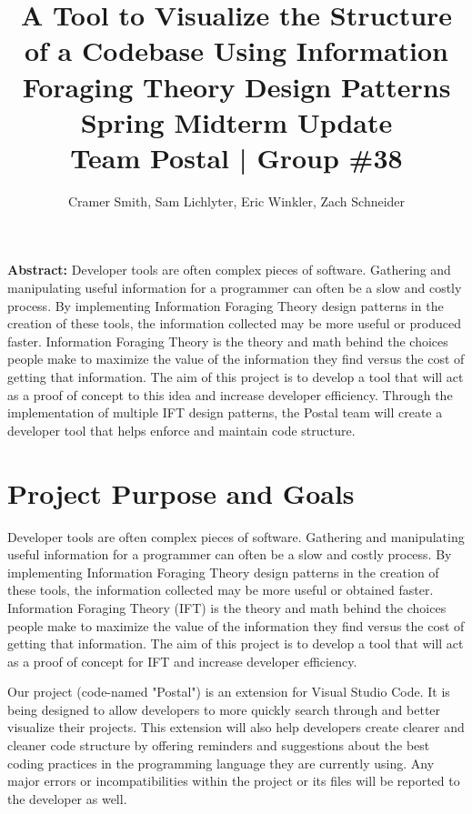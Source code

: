 \documentclass[letterpaper,10pt,titlepage,draftclsnofoot,onecolumn,onesided] {IEEEtran}
\def\doctitle{A Tool to Visualize the Structure of a Codebase Using Information Foraging Theory Design Patterns}
\def\doctype{Progress Report}
\def\doctype{Spring Midterm Update}
\def\team{Team Postal | Group \#38}
\begin{document}
\title{\Huge{\bfseries{\textsf{\doctitle}}}\\\textsf{\Large{\doctype}}\\\textsf{\large{\team}}}
\author{Cramer Smith, Sam Lichlyter, Eric Winkler, Zach Schneider}

\maketitle
\vfill

\setlength\parindent{0pt} \textbf{Abstract:} Developer tools are often complex pieces of software. 
Gathering and manipulating useful information for a programmer can often be a slow and costly process. 
By implementing Information Foraging Theory design patterns in the creation of these tools, the information collected may be more useful or produced faster. 
Information Foraging Theory is the theory and math behind the choices people make to maximize the value of the information they find versus the cost of getting that information.
The aim of this project is to develop a tool that will act as a proof of concept to this idea and increase developer efficiency.
Through the implementation of multiple IFT design patterns, the Postal team will create a developer tool that helps enforce and maintain code structure. 

\vfill

\pagebreak

\tableofcontents


\pagebreak

\section{Project Purpose and Goals}
Developer tools are often complex pieces of software. 
Gathering and manipulating useful information for a programmer can often be a slow and costly process. 
By implementing Information Foraging Theory design patterns in the creation of these tools, the information collected may be more useful or obtained faster. 
Information Foraging Theory (IFT) is the theory and math behind the choices people make to maximize the value of the information they find versus the cost of getting that information.
The aim of this project is to develop a tool that will act as a proof of concept for IFT and increase developer efficiency.

Our project (code-named "Postal") is an extension for Visual Studio Code. 
It is being designed to allow developers to more quickly search through and better visualize their projects.
This extension will also help developers create clearer and cleaner code structure by offering reminders and suggestions about the best coding practices in the programming language they are currently using.
Any major errors or incompatibilities within the project or its files will be reported to the developer as well.
\end{document}
